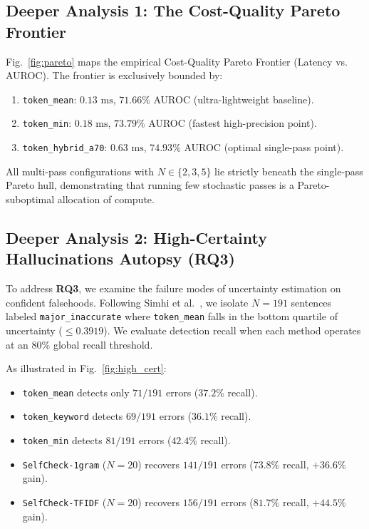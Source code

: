 \documentclass[conference]{IEEEtran}
\begin{document}
\subsection{Deeper Analysis 1: The Cost-Quality Pareto Frontier}
Fig.~\ref{fig:pareto} maps the empirical Cost-Quality Pareto Frontier (Latency vs. AUROC). The frontier is exclusively bounded by:
\begin{enumerate}
    \item \texttt{token\_mean}: $0.13\text{ ms}$, $71.66\%$ AUROC (ultra-lightweight baseline).
    \item \texttt{token\_min}: $0.18\text{ ms}$, $73.79\%$ AUROC (fastest high-precision point).
    \item \texttt{token\_hybrid\_a70}: $0.63\text{ ms}$, $74.93\%$ AUROC (optimal single-pass point).
\end{enumerate}
All multi-pass configurations with $N \in \{2, 3, 5\}$ lie strictly beneath the single-pass Pareto hull, demonstrating that running few stochastic passes is a Pareto-suboptimal allocation of compute.

\subsection{Deeper Analysis 2: High-Certainty Hallucinations Autopsy (RQ3)}
To address \textbf{RQ3}, we examine the failure modes of uncertainty estimation on confident falsehoods. Following Simhi et al.~\cite{simhi2024high}, we isolate $N=191$ sentences labeled \texttt{major\_inaccurate} where \texttt{token\_mean} falls in the bottom quartile of uncertainty ($\le 0.3919$). We evaluate detection recall when each method operates at an $80\%$ global recall threshold.

As illustrated in Fig.~\ref{fig:high_cert}:
\begin{itemize}
    \item \texttt{token\_mean} detects only $71/191$ errors ($\mathbf{37.2\%}$ recall).
    \item \texttt{token\_keyword} detects $69/191$ errors ($\mathbf{36.1\%}$ recall).
    \item \texttt{token\_min} detects $81/191$ errors ($\mathbf{42.4\%}$ recall).
    \item \texttt{SelfCheck-1gram} ($N=20$) recovers $141/191$ errors ($\mathbf{73.8\%}$ recall, $+36.6\%$ gain).
    \item \texttt{SelfCheck-TFIDF} ($N=20$) recovers $156/191$ errors ($\mathbf{81.7\%}$ recall, $\mathbf{+44.5\%}$ gain).
\end{itemize}
\end{document}
